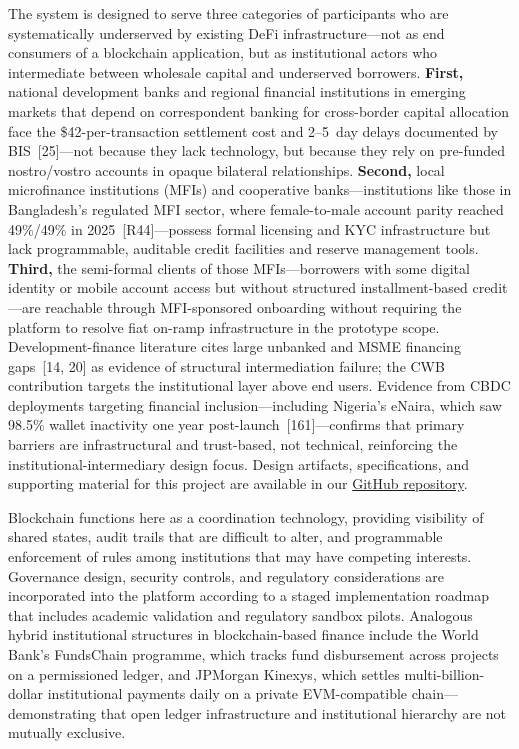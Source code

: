 \documentclass[12pt,a4paper]{report}
\begin{document}
The system is designed to serve three categories of participants who are systematically underserved by existing DeFi infrastructure---not as end consumers of a blockchain application, but as institutional actors who intermediate between wholesale capital and underserved borrowers. \textbf{First,} national development banks and regional financial institutions in emerging markets that depend on correspondent banking for cross-border capital allocation face the \$42-per-transaction settlement cost and 2--5~day delays documented by BIS~[25]---not because they lack technology, but because they rely on pre-funded nostro/vostro accounts in opaque bilateral relationships. \textbf{Second,} local microfinance institutions (MFIs) and cooperative banks---institutions like those in Bangladesh's regulated MFI sector, where female-to-male account parity reached 49\%/49\% in 2025~[R44]---possess formal licensing and KYC infrastructure but lack programmable, auditable credit facilities and reserve management tools. \textbf{Third,} the semi-formal clients of those MFIs---borrowers with some digital identity or mobile account access but without structured installment-based credit---are reachable through MFI-sponsored onboarding without requiring the platform to resolve fiat on-ramp infrastructure in the prototype scope. Development-finance literature cites large unbanked and MSME financing gaps~[14, 20] as evidence of structural intermediation failure; the CWB contribution targets the institutional layer above end users. Evidence from CBDC deployments targeting financial inclusion---including Nigeria's eNaira, which saw 98.5\% wallet inactivity one year post-launch~[161]---confirms that primary barriers are infrastructural and trust-based, not technical, reinforcing the institutional-intermediary design focus. Design artifacts, specifications, and supporting material for this project are available in our \href{https://github.com/Yuvraajrahman/Cryto-World-Bank}{GitHub repository}.

Blockchain functions here as a coordination technology, providing visibility of shared states, audit trails that are difficult to alter, and programmable enforcement of rules among institutions that may have competing interests. Governance design, security controls, and regulatory considerations are incorporated into the platform according to a staged implementation roadmap that includes academic validation and regulatory sandbox pilots. Analogous hybrid institutional structures in blockchain-based finance include the World Bank's FundsChain programme, which tracks fund disbursement across projects on a permissioned ledger, and JPMorgan Kinexys, which settles multi-billion-dollar institutional payments daily on a private EVM-compatible chain---demonstrating that open ledger infrastructure and institutional hierarchy are not mutually exclusive.
\end{document}
